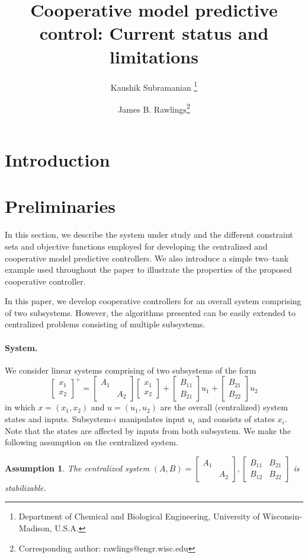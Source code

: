 \documentclass[10pt, twocolumn]{article}
\title{Cooperative  model predictive control: Current status and  limitations }
\author{Kaushik Subramanian \thanks{Department of Chemical and Biological
     Engineering, University of Wisconsin-Madison, U.S.A.}  \and James
  B. Rawlings\footnotemark[1] \thanks{Corresponding author: rawlings@engr.wisc.edu}}
\newtheorem{assumption}{Assumption}
\theoremstyle{definition}
\begin{document}
\maketitle
\section{Introduction}

\section{Preliminaries}
\label{sec:prelim}
In this section, we describe the system under study and the different
constraint sets and objective functions employed for developing the
centralized and cooperative model predictive controllers. We also introduce a
simple two--tank example used throughout the paper to illustrate the
properties of the proposed cooperative controller.

In this paper, we develop cooperative controllers for an overall system comprising of two subsystems. However, the algorithms presented can be easily extended to centralized problems consisting of multiple subsystems.
\paragraph {\textbf{System.}} We consider linear systems comprising of two subsystems  of the form 
\[ \begin{bmatrix}x_1\\x_2\end{bmatrix}^+ = \begin{bmatrix}A_1& \\ & A_2\end{bmatrix}\begin{bmatrix}x_1\\x_2\end{bmatrix}+ \begin{bmatrix}B_{11}\\B_{21}\end{bmatrix}u_1 + \begin{bmatrix}B_{21}\\B_{22}\end{bmatrix}u_2
\]
in which $x = (x_1,x_2)$ and $u = (u_1,u_2)$ are the overall (centralized) system states and inputs. Subsystem-$i$ manipulates input $u_i$ and consists of states $x_i$. Note that the states are affected by inputs from both subsystem. We make the following assumption on the centralized system.
\begin{assumption}
\label{ass:stab}
The centralized system $(A,B) = \begin{bmatrix}A_1& \\ & A_2\end{bmatrix}, \begin{bmatrix}B_{11}& B_{21}\\B_{12} & B_{22}\end{bmatrix}$ is stabilizable. 
\end{assumption}
\end{document}
